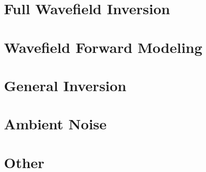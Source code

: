 \documentclass[aspectratio=169, 11pt, t]{beamer}
\newcommand{\secinctex}[1]{}
\begin{document}


\section[FWI]{Full Wavefield Inversion}

\secinctex{Tromp_2005_GJI_Adjoint-method}
\secinctex{Tape_2007_GJI_Adjoint-tomography-2D}
\secinctex{Louboutin_2017_EAGE_Gradient-sampling-algorithm}
\secinctex{Komatitsch_2016_GJI_Anelastic-kernels-with-parsimonious-storage}

\section[Modeling]{Wavefield Forward Modeling}

\section[Inversion]{General Inversion}
\secinctex{Sambridge_2001_IP_Neighborhood-algorithm}
\secinctex{Sambridge_2002_RG_Monte-Carlo-inversion}
\secinctex{Minson_2013_GJI_Bayesian-inversion-for-source}

\section[Noise]{Ambient Noise}
\secinctex{Sager_2018_GJI_Towards-FWANI}

\section{Other}


\end{document}
